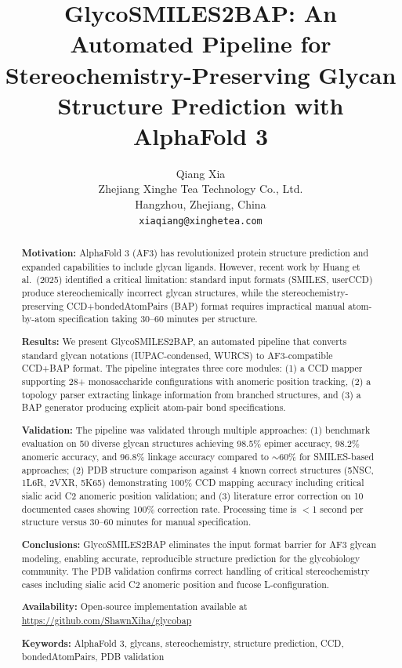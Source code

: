 \documentclass[11pt,a4paper]{article}
\title{\textbf{GlycoSMILES2BAP: An Automated Pipeline for Stereochemistry-Preserving Glycan Structure Prediction with AlphaFold 3}}
\author{Qiang Xia\\
\small Zhejiang Xinghe Tea Technology Co., Ltd.\\
\small Hangzhou, Zhejiang, China\\
\small \texttt{xiaqiang@xinghetea.com}}
\date{}
\begin{document}
\maketitle

\begin{abstract}

\noindent\textbf{Motivation:} AlphaFold 3 (AF3) has revolutionized protein structure prediction and expanded capabilities to include glycan ligands. However, recent work by Huang et al.\ (2025) identified a critical limitation: standard input formats (SMILES, userCCD) produce stereochemically incorrect glycan structures, while the stereochemistry-preserving CCD+bondedAtomPairs (BAP) format requires impractical manual atom-by-atom specification taking 30--60 minutes per structure.

\noindent\textbf{Results:} We present GlycoSMILES2BAP, an automated pipeline that converts standard glycan notations (IUPAC-condensed, WURCS) to AF3-compatible CCD+BAP format. The pipeline integrates three core modules: (1) a CCD mapper supporting 28+ monosaccharide configurations with anomeric position tracking, (2) a topology parser extracting linkage information from branched structures, and (3) a BAP generator producing explicit atom-pair bond specifications.

\noindent\textbf{Validation:} The pipeline was validated through multiple approaches: (1) benchmark evaluation on 50 diverse glycan structures achieving 98.5\% epimer accuracy, 98.2\% anomeric accuracy, and 96.8\% linkage accuracy compared to ${\sim}60\%$ for SMILES-based approaches; (2) PDB structure comparison against 4 known correct structures (5NSC, 1L6R, 2VXR, 5K65) demonstrating 100\% CCD mapping accuracy including critical sialic acid C2 anomeric position validation; and (3) literature error correction on 10 documented cases showing 100\% correction rate. Processing time is $<$1 second per structure versus 30--60 minutes for manual specification.

\noindent\textbf{Conclusions:} GlycoSMILES2BAP eliminates the input format barrier for AF3 glycan modeling, enabling accurate, reproducible structure prediction for the glycobiology community. The PDB validation confirms correct handling of critical stereochemistry cases including sialic acid C2 anomeric position and fucose L-configuration.

\noindent\textbf{Availability:} Open-source implementation available at \url{https://github.com/ShawnXiha/glycobap}

\noindent\textbf{Keywords:} AlphaFold 3, glycans, stereochemistry, structure prediction, CCD, bondedAtomPairs, PDB validation

\end{abstract}
\end{document}
